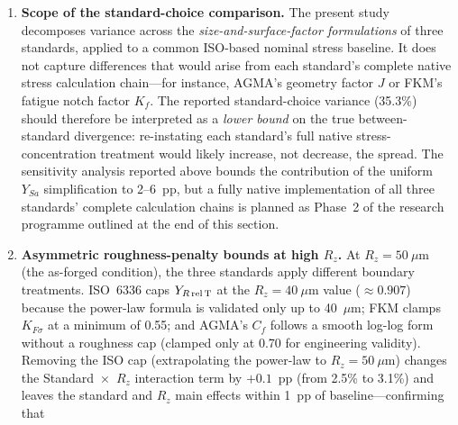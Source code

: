 \documentclass[12pt,a4paper]{article}
\begin{document}
\begin{enumerate}
        I emphasize that the present study does not claim to reproduce
        each standard's complete native workflow. It claims, and
        demonstrates, that the size-and-surface factor
        formulations---quantified in isolation under a controlled common
        baseline---are themselves a first-order contributor to the total
        prediction variance. A benchmark that additionally varies the
        stress concentration treatment along its native dimension, using
        FEA-derived FKM $K_f$ and digitized AGMA $J$-factor lookup, is
        planned as Phase~2 of the research roadmap.%
  \item \textbf{Scope of the standard-choice comparison.} The present study
        decomposes variance across the \emph{size-and-surface-factor
        formulations} of three standards, applied to a common ISO-based
        nominal stress baseline. It does not capture differences that would
        arise from each standard's complete native stress calculation
        chain---for instance, AGMA's geometry factor $J$ or FKM's fatigue
        notch factor $K_f$. The reported standard-choice variance (35.3\%)
        should therefore be interpreted as a \emph{lower bound} on the true
        between-standard divergence: re-instating each standard's full native
        stress-concentration treatment would likely increase, not decrease,
        the spread. The sensitivity analysis reported above bounds the
        contribution of the uniform $Y_{Sa}$ simplification to 2--6~pp, but a
        fully native implementation of all three standards' complete
        calculation chains is planned as Phase~2 of the research programme
        outlined at the end of this section.
  \item \textbf{Asymmetric roughness-penalty bounds at high $R_z$.} At
        $R_z = 50~\mu$m (the as-forged condition), the three standards
        apply different boundary treatments. ISO~6336 caps
        $Y_{R\,\rm rel\,T}$ at the $R_z = 40~\mu$m value
        ($\approx 0.907$) because the power-law formula is validated only
        up to 40~$\mu$m; FKM clamps $K_{F\sigma}$ at a minimum of 0.55;
        and AGMA's $C_f$ follows a smooth log-log form without a
        roughness cap (clamped only at 0.70 for engineering validity).
        Removing the ISO cap (extrapolating the power-law to
        $R_z=50~\mu$m) changes the Standard~$\times$~$R_z$ interaction
        term by $+0.1$~pp (from 2.5\% to 3.1\%) and leaves the standard
        and $R_z$ main effects within 1~pp of baseline---confirming that

\end{enumerate}
\end{document}
